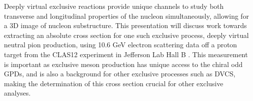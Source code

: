 % 
% 
%




Deeply virtual exclusive reactions provide unique channels to study both transverse and longitudinal properties of the nucleon simultaneously, allowing for a 3D image of nucleon substructure. This presentation will discuss work towards extracting an absolute cross section for one such exclusive process, deeply virtual neutral pion production, using 10.6 GeV electron scattering data off a proton target from the CLAS12 experiment in Jefferson Lab Hall B . This measurement is important as exclusive meson production has unique access to the chiral odd GPDs, and is also a background for other exclusive processes such as DVCS, making the determination of this cross section crucial for other exclusive analyses.
